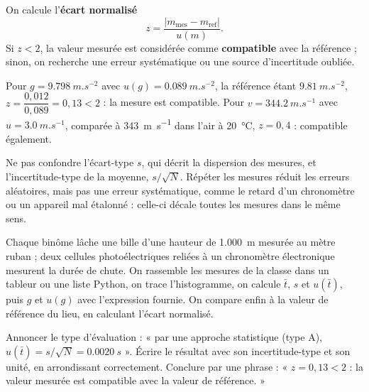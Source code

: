 \begin{loi}
On calcule l'\textbf{écart normalisé}
\[z=\frac{\left|m_\mathrm{mes}-m_\mathrm{ref}\right|}{u(m)}.\]
Si $z<2$, la valeur mesurée est considérée comme \textbf{compatible} avec la référence ; sinon, on recherche une erreur
systématique ou une source d'incertitude oubliée.
\end{loi}
\begin{exemple}
Pour $g=\qty{9,798}{m.s^{-2}}$ avec $u(g)=\qty{0,089}{m.s^{-2}}$, la référence étant $\qty{9,81}{m.s^{-2}}$, $z=\dfrac{0{,}012}{0{,}089}=0{,}13<2$ : la
mesure est compatible. Pour $v=\qty{344,2}{m.s^{-1}}$ avec $u=\qty{3,0}{m.s^{-1}}$, comparée à \qty{343}{m.s^{-1}} dans l'air à \qty{20}{\degreeCelsius},
$z=0{,}4$ : compatible également.
\end{exemple}
\begin{attention}
Ne pas confondre l'écart-type $s$, qui décrit la dispersion des mesures, et l'incertitude-type de la moyenne, $s/\sqrt N$.
Répéter les mesures réduit les erreurs aléatoires, mais pas une erreur systématique, comme le retard d'un chronomètre
ou un appareil mal étalonné : celle-ci décale toutes les mesures dans le même sens.
\end{attention}
\begin{experience}
Chaque binôme lâche une bille d'une hauteur de \qty{1,000}{m} mesurée au mètre ruban ; deux cellules photoélectriques
reliées à un chronomètre électronique mesurent la durée de chute. On rassemble les mesures de la classe dans un
tableur ou une liste Python, on trace l'histogramme, on calcule $\bar t$, $s$ et $u(\bar t)$, puis $g$ et $u(g)$ avec l'expression
fournie. On compare enfin à la valeur de référence du lieu, en calculant l'écart normalisé.
\end{experience}
\begin{rediger}
Annoncer le type d'évaluation : « par une approche statistique (type A), $u(\bar t)=s/\sqrt N=\qty{0,0020}{s}$ ». Écrire le
résultat avec son incertitude-type et son unité, en arrondissant correctement. Conclure par une phrase : « $z=0{,}13<2$ :
la valeur mesurée est compatible avec la valeur de référence. »
\end{rediger}
\exercices

